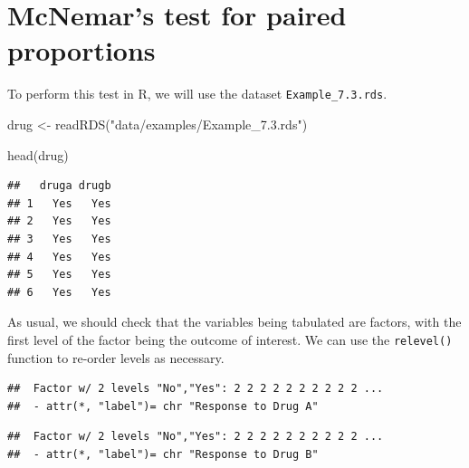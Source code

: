 \documentclass[
]{memoir}
\newenvironment{Shaded}{\begin{snugshade}}{\end{snugshade}}
\newcommand{\FunctionTok}[1]{\textcolor[rgb]{0.00,0.00,0.00}{#1}}
\newcommand{\NormalTok}[1]{#1}
\newcommand{\OtherTok}[1]{\textcolor[rgb]{0.56,0.35,0.01}{#1}}
\newcommand{\SpecialCharTok}[1]{\textcolor[rgb]{0.00,0.00,0.00}{#1}}
\newcommand{\StringTok}[1]{\textcolor[rgb]{0.31,0.60,0.02}{#1}}
\begin{document}
\hypertarget{mcnemars-test-for-paired-proportions}{%
\section{McNemar's test for paired proportions}\label{mcnemars-test-for-paired-proportions}}

To perform this test in R, we will use the dataset \texttt{Example\_7.3.rds}.

\begin{Shaded}
\begin{Highlighting}[]
\NormalTok{drug }\OtherTok{\textless{}{-}} \FunctionTok{readRDS}\NormalTok{(}\StringTok{"data/examples/Example\_7.3.rds"}\NormalTok{)}

\FunctionTok{head}\NormalTok{(drug)}
\end{Highlighting}
\end{Shaded}

\begin{verbatim}
##   druga drugb
## 1   Yes   Yes
## 2   Yes   Yes
## 3   Yes   Yes
## 4   Yes   Yes
## 5   Yes   Yes
## 6   Yes   Yes
\end{verbatim}

As usual, we should check that the variables being tabulated are factors, with the first level of the factor being the outcome of interest. We can use the \texttt{relevel()} function to re-order levels as necessary.

\begin{Shaded}
\end{Shaded}

\begin{verbatim}
##  Factor w/ 2 levels "No","Yes": 2 2 2 2 2 2 2 2 2 2 ...
##  - attr(*, "label")= chr "Response to Drug A"
\end{verbatim}

\begin{Shaded}
\end{Shaded}

\begin{verbatim}
##  Factor w/ 2 levels "No","Yes": 2 2 2 2 2 2 2 2 2 2 ...
##  - attr(*, "label")= chr "Response to Drug B"
\end{verbatim}
\end{document}
